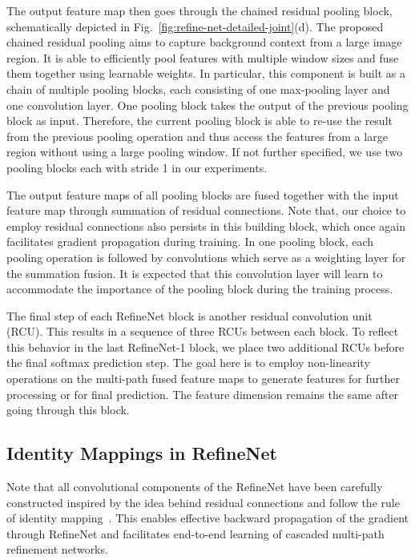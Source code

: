 \documentclass[10pt,twocolumn,letterpaper]{article}
\newcommand{\Fig}{Fig.\xspace}
\newcommand{\myparagraph}[1]{\vspace{.5em}\noindent\textbf{#1}}
\begin{document}
The output feature map then goes through the chained residual pooling block, schematically depicted in \Fig~\ref{fig:refine-net-detailed-joint}(d).
The proposed chained residual pooling aims to capture background context from a large image region.
It is able to efficiently pool features with multiple window sizes and fuse them together using learnable weights.
In particular, this component is built as a chain of multiple pooling blocks, each consisting of one max-pooling layer and one convolution layer.
One pooling block takes the output of the previous pooling block as input. 
Therefore, the current pooling block is able to re-use the result from the previous pooling operation and thus access the features from a large region without using a large pooling window.
If not further specified, we use two pooling blocks each with stride 1 in our experiments.

The output feature maps of all pooling blocks are fused together with the input feature map through summation of residual connections.
Note that, our choice to employ residual connections also persists in this building block, which once again facilitates gradient propagation during training.
In one pooling block, each pooling operation is followed by convolutions which serve as a weighting layer for the summation fusion.
It is expected that this convolution layer will learn to accommodate the importance of the pooling block during the training process.

The final step of each RefineNet block is another residual convolution unit (RCU). This results in a sequence of three RCUs between each block. To reflect this behavior in the last RefineNet-1 block, we place two additional RCUs before the final softmax prediction step.
The goal here is to employ non-linearity operations on the multi-path fused feature maps to generate features for further processing or for final prediction.
The feature dimension remains the same after going through this block.

\subsection{Identity Mappings in RefineNet}
Note that all convolutional components of the RefineNet have been carefully constructed inspired by the idea behind residual connections and follow the rule of identity mapping~\cite{he2016identity}. 
This enables effective backward propagation of the gradient through RefineNet and facilitates end-to-end learning of cascaded multi-path refinement networks.
\end{document}
